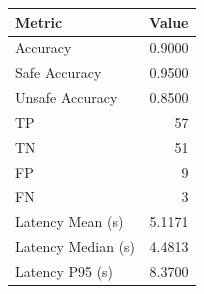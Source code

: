\begin{table}[ht]
\centering
\begin{tabular}{lr}
\toprule
Metric & Value \\
\midrule
Accuracy & 0.9000 \\
Safe Accuracy & 0.9500 \\
Unsafe Accuracy & 0.8500 \\
TP & 57 \\
TN & 51 \\
FP & 9 \\
FN & 3 \\
Latency Mean (s) & 5.1171 \\
Latency Median (s) & 4.4813 \\
Latency P95 (s) & 8.3700 \\
\bottomrule
\end{tabular}
\end{table}